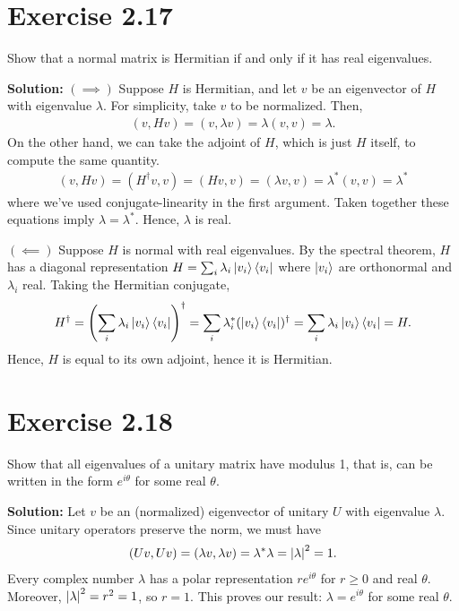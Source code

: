 \documentclass{book}
\begin{document}
\section*{Exercise 2.17}
    Show that a normal matrix is Hermitian if and only if it has real eigenvalues.
    
    \textbf{Solution:} $(\implies)$ Suppose $H$ is Hermitian, and let $v$ be an eigenvector of $H$ with eigenvalue $\lambda$. For simplicity, take $v$ to be normalized. Then,
    \begin{align}
        (v, Hv) = (v, \lambda v) = \lambda (v, v) = \lambda. 
    \end{align}
    On the other hand, we can take the adjoint of $H$, which is just $H$ itself, to compute the same quantity.
    \begin{align}
        (v, Hv) = (H^\dagger v, v) = (Hv,v) = (\lambda v, v) = \lambda^* (v,v) = \lambda^*
    \end{align}
    where we've used conjugate-linearity in the first argument. Taken together these equations imply $\lambda = \lambda^*$. Hence, $\lambda$ is real. 
    
    $(\impliedby)$ Suppose $H$ is normal with real eigenvalues. By the spectral theorem, $H$ has a diagonal representation $H = \sum_i \lambda_i \ket{v_i}\bra{v_i}$ where $\ket{v_i}$ are orthonormal and $\lambda_i$ real. Taking the Hermitian conjugate,
    \begin{align}
        H^\dagger = \left(\sum_i \lambda_i \ket{v_i}\bra{v_i}\right)^\dagger
        = \sum_i \lambda_i^* (\ket{v_i}\bra{v_i})^\dagger = \sum_i \lambda_i \ket{v_i}\bra{v_i} = H.
    \end{align}
    Hence, $H$ is equal to its own adjoint, hence it is Hermitian.
    
\section*{Exercise 2.18}
    Show that all eigenvalues of a unitary matrix have modulus 1, that is, can be written in the form $e^{i\theta}$ for some real $\theta$.
    
    \textbf{Solution:} Let $v$ be an (normalized) eigenvector of unitary $U$ with eigenvalue $\lambda$. Since unitary operators preserve the norm, we must have
    \begin{align}
        (Uv, Uv) = (\lambda v, \lambda v) = \lambda^* \lambda = \abs{\lambda}^2 = 1.
    \end{align}
    Every complex number $\lambda$ has a polar representation $r e^{i\theta}$ for $r\geq 0$ and real $\theta$. Moreover, $\abs{\lambda}^2 = r^2 = 1$, so $r = 1$. This proves our result: $\lambda = e^{i\theta}$ for some real $\theta$.
    
\end{document}
